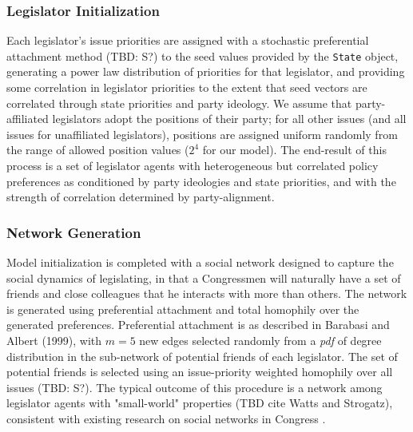\documentclass[pdftex,12pt]{llncs}
\begin{document}
\subsubsection{Legislator Initialization}
Each legislator's issue priorities are assigned with a stochastic preferential attachment method (TBD: S?) to the seed values provided by the \texttt{State} object, generating a power law distribution of priorities for that legislator, and providing some correlation in legislator priorities to the extent that seed vectors are correlated through state priorities and party ideology.
We assume that party-affiliated legislators adopt the positions of their party; for all other issues (and all issues for unaffiliated legislators), positions are assigned uniform randomly from the range of allowed position values ($2^4$ for our model).
The end-result of this process is a set of legislator agents with heterogeneous but correlated policy preferences as conditioned by party ideologies and state priorities, and with the strength of correlation determined by party-alignment.
\subsubsection{Network Generation}
Model initialization is completed with a social network designed to capture the social dynamics of legislating, in that a Congressmen will naturally have a set of friends and close colleagues that he interacts with more than others.
The network is generated using preferential attachment and total homophily over the generated preferences.
Preferential attachment is as described in Barabasi and Albert (1999), with $m=5$ new edges selected randomly from a \textit{pdf} of degree distribution in the sub-network of potential friends of each legislator.
The set of potential friends is selected using an issue-priority weighted homophily over all issues (TBD: S?).
The typical outcome of this procedure is a network among legislator agents with "small-world" properties (TBD cite Watts and Strogatz), consistent with existing research on social networks in Congress \parencite{Granovetter1978}.
\end{document}
